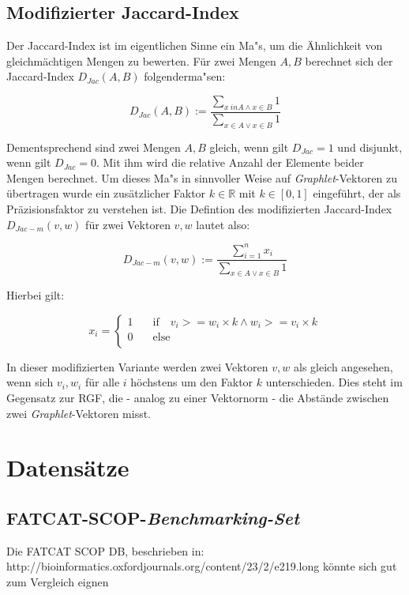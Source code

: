 \documentclass{report}
\begin{document}
\subsection{Modifizierter Jaccard-Index}

Der Jaccard-Index ist im eigentlichen Sinne ein Ma"s, um die \"Ahnlichkeit von gleichm\"achtigen Mengen zu bewerten. F\"ur zwei Mengen $A,B$ berechnet sich der Jaccard-Index $D_{Jac}(A,B)$ folgenderma"sen:

\[ D_{Jac}(A,B) := \frac{\sum_{x \ in A \land x \in B} 1}{\sum_{x \in A \lor x \in B} 1} \]

Dementsprechend sind zwei Mengen $A,B$ gleich, wenn  gilt $D_{Jac} = 1$ und disjunkt, wenn gilt $D_{Jac} = 0$. Mit ihm wird die relative Anzahl der Elemente beider Mengen berechnet.
Um dieses Ma"s in sinnvoller Weise auf \textit{Graphlet}-Vektoren zu \"ubertragen wurde ein zus\"atzlicher Faktor $k \in \mathbb{R} $ mit $k \in [0,1]$  eingef\"uhrt, der als Pr\"azisionsfaktor zu verstehen ist. Die Defintion des modifizierten Jaccard-Index $D_{Jac-m}(v,w)$ f\"ur zwei Vektoren $v,w$ lautet also:

\[ D_{Jac-m}(v,w) := \frac{\sum_{i = 1}^n x_i}{\sum_{x \in A \lor x \in B} 1} \]

Hierbei gilt:

\[ x_i = 
   \begin{cases}
     1     & \quad \mathrm{if} \quad v_i >= w_i \times k \land w_i >= v_i \times k \\
     0     & \quad \mathrm{else} \\
   \end{cases}
\]

In dieser modifizierten Variante werden zwei Vektoren $v,w$ als gleich angesehen, wenn sich $v_i,w_i$ f\"ur alle $i$ h\"ochstens um den Faktor $k$ unterschieden.
Dies steht im Gegensatz zur RGF, die - analog zu einer Vektornorm - die Abst\"ande zwischen zwei \textit{Graphlet}-Vektoren misst.



\section{Datens\"atze}


\subsection{FATCAT-SCOP-\textit{Benchmarking-Set}}

Die FATCAT SCOP DB, beschrieben in: http://bioinformatics.oxfordjournals.org/content/23/2/e219.long
k\"onnte sich gut zum Vergleich eignen
\end{document}
